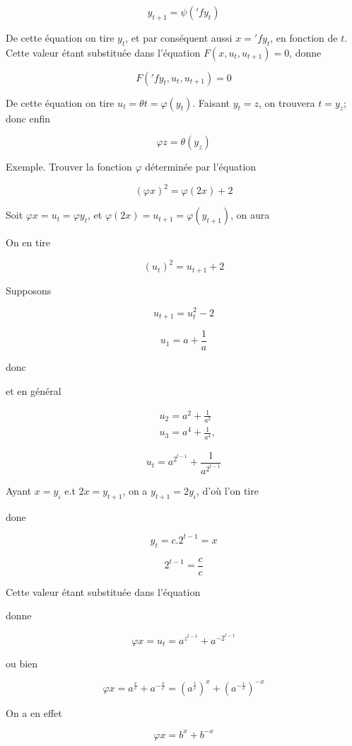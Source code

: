 \documentclass{article}
\begin{document}
\[
y_{t+1}=\psi\left(' f y_{t}\right)
\]

De cette équation on tire \(y_{t}\), et par conséquent aussi \(x=' f y_{t}\), en fonction de \(t\). Cette valeur étant substituée dans l'équation \(F\left(x, u_{t}, u_{t+1}\right)=0\), donne

\[
F\left(' f y_{t}, u_{t}, u_{t+1}\right)=0
\]

De cette équation on tire \(u_{t}=\theta t=\varphi\left(y_{t}\right)\). Faisant \(y_{t}=z\), on trouvera \(t=y_{z} ;\) donc enfin

\[
\varphi z=\theta\left(y_{z}\right)
\]

Exemple. Trouver la fonction \(\varphi\) déterminée par l'équation

\[
(\varphi x)^{2}=\varphi(2 x)+2
\]

Soit \(\varphi x=u_{t}=\varphi y_{t}\), et \(\varphi(2 x)=u_{t+1}=\varphi\left(y_{t+1}\right)\), on aura

On en tire

\[
\left(u_{t}\right)^{2}=u_{t+1}+2
\]

Supposons

\[
u_{t+1}=u_{t}^{2}-2
\]

\[
u_{1}=a+\frac{1}{a}
\]

donc

et en général

\[
\begin{aligned}
& u_{2}=a^{2}+\frac{1}{a^{2}} \\
& u_{3}=a^{4}+\frac{1}{a^{4}},
\end{aligned}
\]

\[
u_{t}=a^{2^{t-1}}+\frac{1}{a^{2^{t-1}}}
\]

Ayant \(x=y_{\iota}\) e.t \(2 x=y_{t+1}\), on a \(y_{t+1}=2 y_{\iota}\), d'où l'on tire

done

\[
y_{t}=c .2^{t-1}=x
\]

\[
2^{t-1}=\frac{c}{c}
\]

Cette valeur étant substituée dans l'équation

donne

\[
\varphi x=u_{t}=a^{z^{t-1}}+a^{-2^{t-1}}
\]

ou bien

\[
\varphi x=a^{\frac{x}{c}}+a^{-\frac{x}{c}}=\left(a^{\frac{1}{c}}\right)^{x}+\left(a^{-\frac{1}{c}}\right)^{-x}
\]

On a en effet

\[
\varphi x=b^{x}+b^{-x}
\]
\end{document}
